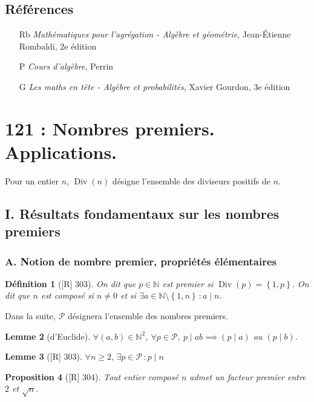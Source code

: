 \documentclass[10pt, a4paper, parskip=full, twoside, twocolumn]{report}
\newtheorem{definition}{Définition}
\newtheorem{proposition}[definition]{Proposition}
\newtheorem{lemma}[definition]{Lemme}
\newcommand{\IN}{\mathbb{N}}
\DeclareMathOperator{\Div}{Div}
\begin{document}
\section*{Références}
\begin{itemize}
	\item[Rb] \emph{Mathématiques pour l'agrégation - Algèbre et géométrie}, Jean-Étienne Rombaldi, 2e édition
	\item[P] \emph{Cours d'algèbre}, Perrin
	\item[G] \emph{Les maths en tête - Algèbre et probabilités}, Xavier Gourdon, 3e édition
\end{itemize}

\chapter*{121 : Nombres premiers. Applications.}
\setcounter{definition}{0}
Pour un entier $n$, $\Div(n)$ désigne l'ensemble des diviseurs positifs de $n$.	

\section*{I. Résultats fondamentaux sur les nombres premiers}
\subsection*{A. Notion de nombre premier, propriétés élémentaires}

\begin{definition}[\textnormal{[R] 303}]
	On dit que $p\in\IN$ est \emph{premier} si $\Div(p)=\left\{1,p\right\}$.
	On dit que $n$ est \emph{composé} si $n\neq 0$ et si $\exists a\in\IN\setminus\left\{1,n\right\}\,\colon a\mid n$.
\end{definition}

Dans la suite, $\mathcal{P}$ désignera l'ensemble des nombres premiers.

\begin{lemma}[d'Euclide]
	$\forall(a,b)\in\IN^2$, $\forall p\in\mathcal{P}$, $p\mid ab \implies (p\mid a)$ ou $(p\mid b)$.
\end{lemma}

\begin{lemma}[\textnormal{[R] 303}]
	$\forall n\geq 2,\, \exists p\in\mathcal{P}\,\colon p\mid n$
\end{lemma}

\begin{proposition}[\textnormal{[R] 304}]
	Tout entier composé $n$ admet un facteur premier entre $2$ et $\sqrt{n}$.
\end{proposition}
\end{document}
